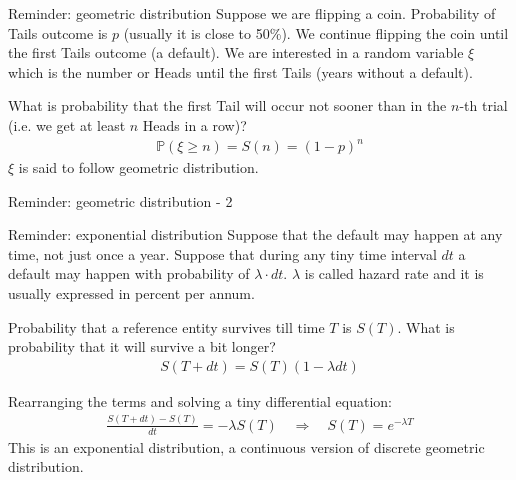 \documentclass{beamer}
\begin{document}
\begin{frame}{Reminder: geometric distribution}
\justify
Suppose we are flipping a coin. Probability of Tails outcome is $p$ (usually it is close to 50\%). We continue flipping the coin until the first Tails outcome (a default). We are interested in a random variable $\xi$ which is the number or Heads until the first Tails (years without a default).

\justify
What is probability that the first Tail will occur not sooner than in the $n$-th trial (i.e. we get at least $n$ Heads in a row)?
\begin{align*}
\mathbb{P}(\xi \ge n) = S(n) = (1 - p)^{n}
\end{align*}
\justify
$\xi$ is said to follow geometric distribution.
\end{frame}



\begin{frame}{Reminder: geometric distribution - 2}
\centering
{}
\end{frame}



\begin{frame}{Reminder: exponential distribution}
\justify
Suppose that the default may happen at any time, not just once a year. Suppose that during any tiny time interval $dt$ a default may happen with probability of $\lambda \cdot dt$. $\lambda$ is called \alert{hazard rate} and it is usually expressed in percent per annum.

\justify
Probability that a reference entity survives till time $T$ is $S(T)$. What is probability that it will survive a bit longer?
\begin{align*}
S(T+dt) = S(T)(1 - \lambda dt)
\end{align*}

\justify
Rearranging the terms and solving a tiny differential equation:
\begin{align*}
\frac{S(T+dt) - S(T)}{dt} = -\lambda S(T) \quad
\Rightarrow
\quad
S(T) = e^{-\lambda T}
\end{align*}
\justify
This is an exponential distribution, a continuous version of discrete geometric distribution.
\end{frame}
\end{document}
